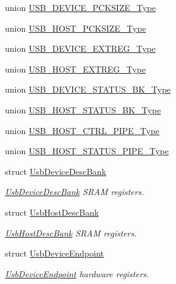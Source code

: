 \begin{DoxyCompactItemize}
\item 
union \mbox{\hyperlink{union_u_s_b___d_e_v_i_c_e___p_c_k_s_i_z_e___type}{U\+S\+B\+\_\+\+D\+E\+V\+I\+C\+E\+\_\+\+P\+C\+K\+S\+I\+Z\+E\+\_\+\+Type}}
\item 
union \mbox{\hyperlink{union_u_s_b___h_o_s_t___p_c_k_s_i_z_e___type}{U\+S\+B\+\_\+\+H\+O\+S\+T\+\_\+\+P\+C\+K\+S\+I\+Z\+E\+\_\+\+Type}}
\item 
union \mbox{\hyperlink{union_u_s_b___d_e_v_i_c_e___e_x_t_r_e_g___type}{U\+S\+B\+\_\+\+D\+E\+V\+I\+C\+E\+\_\+\+E\+X\+T\+R\+E\+G\+\_\+\+Type}}
\item 
union \mbox{\hyperlink{union_u_s_b___h_o_s_t___e_x_t_r_e_g___type}{U\+S\+B\+\_\+\+H\+O\+S\+T\+\_\+\+E\+X\+T\+R\+E\+G\+\_\+\+Type}}
\item 
union \mbox{\hyperlink{union_u_s_b___d_e_v_i_c_e___s_t_a_t_u_s___b_k___type}{U\+S\+B\+\_\+\+D\+E\+V\+I\+C\+E\+\_\+\+S\+T\+A\+T\+U\+S\+\_\+\+B\+K\+\_\+\+Type}}
\item 
union \mbox{\hyperlink{union_u_s_b___h_o_s_t___s_t_a_t_u_s___b_k___type}{U\+S\+B\+\_\+\+H\+O\+S\+T\+\_\+\+S\+T\+A\+T\+U\+S\+\_\+\+B\+K\+\_\+\+Type}}
\item 
union \mbox{\hyperlink{union_u_s_b___h_o_s_t___c_t_r_l___p_i_p_e___type}{U\+S\+B\+\_\+\+H\+O\+S\+T\+\_\+\+C\+T\+R\+L\+\_\+\+P\+I\+P\+E\+\_\+\+Type}}
\item 
union \mbox{\hyperlink{union_u_s_b___h_o_s_t___s_t_a_t_u_s___p_i_p_e___type}{U\+S\+B\+\_\+\+H\+O\+S\+T\+\_\+\+S\+T\+A\+T\+U\+S\+\_\+\+P\+I\+P\+E\+\_\+\+Type}}
\item 
struct \mbox{\hyperlink{struct_usb_device_desc_bank}{Usb\+Device\+Desc\+Bank}}
\begin{DoxyCompactList}\small\item\em \mbox{\hyperlink{struct_usb_device_desc_bank}{Usb\+Device\+Desc\+Bank}} S\+R\+AM registers. \end{DoxyCompactList}\item 
struct \mbox{\hyperlink{struct_usb_host_desc_bank}{Usb\+Host\+Desc\+Bank}}
\begin{DoxyCompactList}\small\item\em \mbox{\hyperlink{struct_usb_host_desc_bank}{Usb\+Host\+Desc\+Bank}} S\+R\+AM registers. \end{DoxyCompactList}\item 
struct \mbox{\hyperlink{struct_usb_device_endpoint}{Usb\+Device\+Endpoint}}
\begin{DoxyCompactList}\small\item\em \mbox{\hyperlink{struct_usb_device_endpoint}{Usb\+Device\+Endpoint}} hardware registers. \end{DoxyCompactList}\item 

\end{DoxyCompactItemize}
